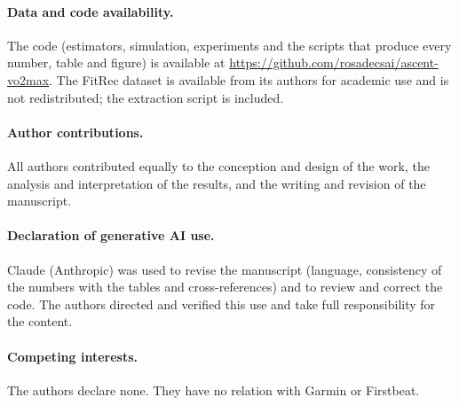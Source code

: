 \documentclass[11pt,a4paper]{article}
\begin{document}
\paragraph{Data and code availability.} The code (estimators, simulation, experiments and the scripts that produce every number, table and figure) is available at \url{https://github.com/rosadecsai/ascent-vo2max}. The FitRec dataset is available from its authors for academic use \citep{ni2019} and is not redistributed; the extraction script is included.

\paragraph{Author contributions.} All authors contributed equally to the conception and design of the work, the analysis and interpretation of the results, and the writing and revision of the manuscript.

\paragraph{Declaration of generative AI use.} Claude (Anthropic) was used to revise the manuscript (language, consistency of the numbers with the tables and cross-references) and to review and correct the code. The authors directed and verified this use and take full responsibility for the content.

\paragraph{Competing interests.} The authors declare none. They have no relation with Garmin or Firstbeat.
\end{document}
